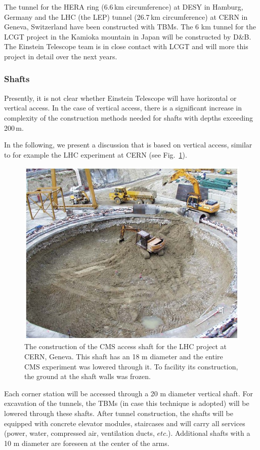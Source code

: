 The tunnel for the HERA ring (6.6\,km circumference) at DESY in Hamburg, Germany
and the LHC (the LEP) tunnel (26.7\,km circumference) at CERN in Geneva, Switzerland
have been constructed with TBMs. The 6 km tunnel for the LCGT project in the
Kamioka mountain in Japan will be constructed by D\&B. The Einstein Telescope team is in close
contact with LCGT and will more this project in detail over the next years.

\FloatBarrier
\subsubsection{Shafts}

Presently, it is not clear whether Einstein Telescope will have horizontal or vertical access.
In the case of vertical access, there is a significant increase in complexity of the
construction methods needed for shafts with depths exceeding 200\,m. 

In the following, we present a discussion that is based on vertical access, similar
to for example the LHC experiment at CERN (see Fig.~\ref{fig:shaft}).

\begin{figure}[htbp!]
\centering
\includegraphics[width=12cm]{./Sec_SiteInfra/Figures/shaft.jpg}
\caption{The construction of the CMS access shaft for the LHC project at CERN, Geneva.
This shaft has an 18 m diameter and the entire CMS experiment was lowered through
it. To facility its construction, the ground at the shaft walls was frozen.}
\label{fig:shaft}
\end{figure}
Each corner station will be accessed through a 20 m diameter vertical shaft.
For excavation of the tunnels, the TBMs (in case this technique is adopted)
will be lowered through these shafts. After tunnel construction, the shafts
will be equipped with concrete elevator modules, staircases and will carry all
services (power, water, compressed air, ventilation ducts, $etc.$). Additional
shafts with a 10 m diameter are foreseen at the center of the arms.

